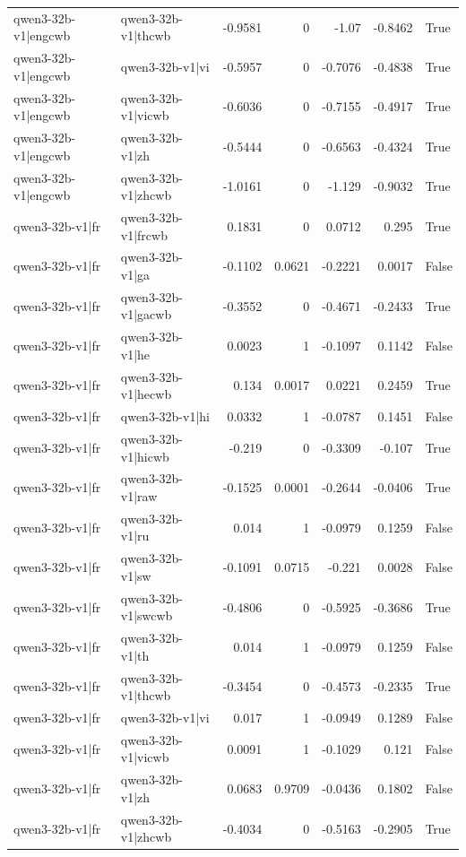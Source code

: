 \begin{table}
\begin{tabular}{l l r r r r l}
qwen3-32b-v1|engcwb & qwen3-32b-v1|thcwb & -0.9581 & 0 & -1.07 & -0.8462 & True \\
qwen3-32b-v1|engcwb & qwen3-32b-v1|vi & -0.5957 & 0 & -0.7076 & -0.4838 & True \\
qwen3-32b-v1|engcwb & qwen3-32b-v1|vicwb & -0.6036 & 0 & -0.7155 & -0.4917 & True \\
qwen3-32b-v1|engcwb & qwen3-32b-v1|zh & -0.5444 & 0 & -0.6563 & -0.4324 & True \\
qwen3-32b-v1|engcwb & qwen3-32b-v1|zhcwb & -1.0161 & 0 & -1.129 & -0.9032 & True \\
qwen3-32b-v1|fr & qwen3-32b-v1|frcwb & 0.1831 & 0 & 0.0712 & 0.295 & True \\
qwen3-32b-v1|fr & qwen3-32b-v1|ga & -0.1102 & 0.0621 & -0.2221 & 0.0017 & False \\
qwen3-32b-v1|fr & qwen3-32b-v1|gacwb & -0.3552 & 0 & -0.4671 & -0.2433 & True \\
qwen3-32b-v1|fr & qwen3-32b-v1|he & 0.0023 & 1 & -0.1097 & 0.1142 & False \\
qwen3-32b-v1|fr & qwen3-32b-v1|hecwb & 0.134 & 0.0017 & 0.0221 & 0.2459 & True \\
qwen3-32b-v1|fr & qwen3-32b-v1|hi & 0.0332 & 1 & -0.0787 & 0.1451 & False \\
qwen3-32b-v1|fr & qwen3-32b-v1|hicwb & -0.219 & 0 & -0.3309 & -0.107 & True \\
qwen3-32b-v1|fr & qwen3-32b-v1|raw & -0.1525 & 0.0001 & -0.2644 & -0.0406 & True \\
qwen3-32b-v1|fr & qwen3-32b-v1|ru & 0.014 & 1 & -0.0979 & 0.1259 & False \\
qwen3-32b-v1|fr & qwen3-32b-v1|sw & -0.1091 & 0.0715 & -0.221 & 0.0028 & False \\
qwen3-32b-v1|fr & qwen3-32b-v1|swcwb & -0.4806 & 0 & -0.5925 & -0.3686 & True \\
qwen3-32b-v1|fr & qwen3-32b-v1|th & 0.014 & 1 & -0.0979 & 0.1259 & False \\
qwen3-32b-v1|fr & qwen3-32b-v1|thcwb & -0.3454 & 0 & -0.4573 & -0.2335 & True \\
qwen3-32b-v1|fr & qwen3-32b-v1|vi & 0.017 & 1 & -0.0949 & 0.1289 & False \\
qwen3-32b-v1|fr & qwen3-32b-v1|vicwb & 0.0091 & 1 & -0.1029 & 0.121 & False \\
qwen3-32b-v1|fr & qwen3-32b-v1|zh & 0.0683 & 0.9709 & -0.0436 & 0.1802 & False \\
qwen3-32b-v1|fr & qwen3-32b-v1|zhcwb & -0.4034 & 0 & -0.5163 & -0.2905 & True \\

\end{tabular}
\end{table}
